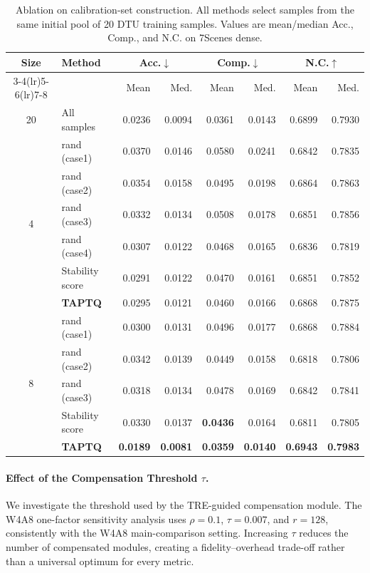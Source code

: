 \documentclass[journal]{Tail_Aware_Post_Training_Quantization_for_3D_Geometry_Models_TMM/IEEEtran}
\begin{document}
\begin{table}[t]
\caption{Ablation on calibration-set construction. All methods select samples from the same initial pool of 20 DTU training samples. Values are mean/median Acc., Comp., and N.C. on 7Scenes dense.}
\label{tab:calib_ablation_7scenes}
\centering
\scriptsize
\setlength{\tabcolsep}{2.2pt}
\begin{tabular}{@{}clrrrrrr@{}}
\toprule
Size & Method & \multicolumn{2}{c}{Acc.$\downarrow$} & \multicolumn{2}{c}{Comp.$\downarrow$} & \multicolumn{2}{c}{N.C.$\uparrow$} \\
\cmidrule(lr){3-4}\cmidrule(lr){5-6}\cmidrule(lr){7-8}
& & Mean & Med. & Mean & Med. & Mean & Med. \\
\midrule
20 & All samples & 0.0236 & 0.0094 & 0.0361 & 0.0143 & 0.6899 & 0.7930 \\
\midrule
\multirow{6}{*}{4}
& rand (case1) & 0.0370 & 0.0146 & 0.0580 & 0.0241 & 0.6842 & 0.7835 \\
& rand (case2) & 0.0354 & 0.0158 & 0.0495 & 0.0198 & 0.6864 & 0.7863 \\
& rand (case3) & 0.0332 & 0.0134 & 0.0508 & 0.0178 & 0.6851 & 0.7856 \\
& rand (case4) & 0.0307 & 0.0122 & 0.0468 & 0.0165 & 0.6836 & 0.7819 \\
& Stability score & 0.0291 & 0.0122 & 0.0470 & 0.0161 & 0.6851 & 0.7852 \\
& \textbf{TAPTQ} & 0.0295 & 0.0121 & 0.0460 & 0.0166 & 0.6868 & 0.7875 \\
\midrule
\multirow{5}{*}{8}
& rand (case1) & 0.0300 & 0.0131 & 0.0496 & 0.0177 & 0.6868 & 0.7884 \\
& rand (case2) & 0.0342 & 0.0139 & 0.0449 & 0.0158 & 0.6818 & 0.7806 \\
& rand (case3) & 0.0318 & 0.0134 & 0.0478 & 0.0169 & 0.6842 & 0.7841 \\
& Stability score & 0.0330 & 0.0137 & \textbf{0.0436} & 0.0164 & 0.6811 & 0.7805 \\
& \textbf{TAPTQ} & \textbf{0.0189} & \textbf{0.0081} & \textbf{0.0359} & \textbf{0.0140} & \textbf{0.6943} & \textbf{0.7983} \\
\bottomrule
\end{tabular}
\end{table}

\paragraph{Effect of the Compensation Threshold $\tau$.}
We investigate the threshold used by the TRE-guided compensation module. The W4A8 one-factor sensitivity analysis uses $\rho=0.1$, $\tau=0.007$, and $r=128$, consistently with the W4A8 main-comparison setting. Increasing $\tau$ reduces the number of compensated modules, creating a fidelity--overhead trade-off rather than a universal optimum for every metric.
\end{document}

